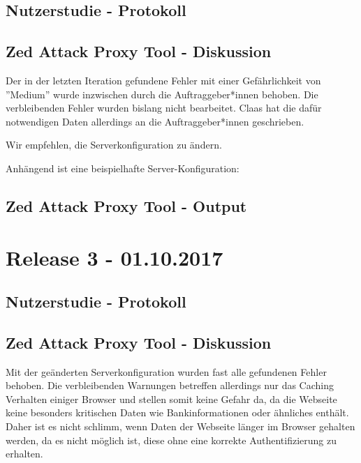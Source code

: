 \documentclass[accentcolor=tud0b,12pt,paper=a4]{tudreport}
\begin{document}
	\subsection*{Nutzerstudie - Protokoll}
	

	\subsection*{Zed Attack Proxy Tool - Diskussion}
	Der in der letzten Iteration gefundene Fehler mit einer Gefährlichkeit von ''Medium'' wurde inzwischen durch die Auftraggeber*innen behoben. Die verbleibenden Fehler wurden bislang nicht bearbeitet. Claas hat die dafür notwendigen Daten allerdings an die Auftraggeber*innen geschrieben.

	Wir empfehlen, die Serverkonfiguration zu ändern.

	Anhängend ist eine beispielhafte Server-Konfiguration:

	

	\subsection*{Zed Attack Proxy Tool - Output}
	


\section{Release 3 - 01.10.2017}

	\subsection*{Nutzerstudie - Protokoll}
	
	
	\subsection*{Zed Attack Proxy Tool - Diskussion}
	Mit der geänderten Serverkonfiguration wurden fast alle gefundenen Fehler behoben. Die verbleibenden Warnungen betreffen allerdings nur das Caching Verhalten einiger Browser und stellen somit keine Gefahr da, da die Webseite keine besonders kritischen Daten wie Bankinformationen oder ähnliches enthält. Daher ist es nicht schlimm, wenn Daten der Webseite länger im Browser gehalten werden, da es nicht möglich ist, diese ohne eine korrekte Authentifizierung zu erhalten.
\end{document}

